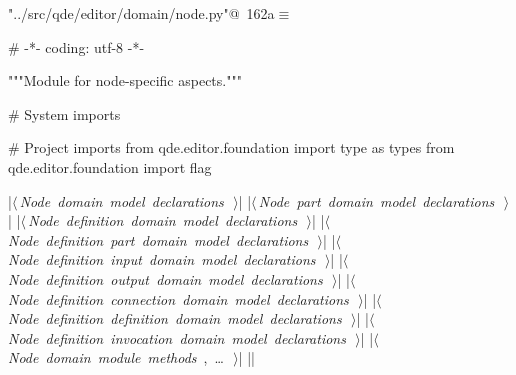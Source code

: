 \documentclass[%
    a4paper,    %
    justified,  %
    nobib,      %
    openany     %
]{tufte-book}
\begin{document}
\begin{flushleft} \small
\begin{minipage}{\linewidth}\label{scrap187}\raggedright\small
{} \verb@"../src/qde/editor/domain/node.py"@\nobreak\ {\footnotesize {162a}}$\equiv$
\vspace{-1ex}
\begin{pythoncode}
# -*- coding: utf-8 -*-

"""Module for node-specific aspects."""

# System imports

# Project imports
from qde.editor.foundation import type as types
from qde.editor.foundation import flag

|\hbox{$\langle\,${\itshape Node domain model declarations}\nobreak\ {\footnotesize {}}$\,\rangle$}|
|\hbox{$\langle\,${\itshape Node part domain model declarations}\nobreak\ {\footnotesize {}}$\,\rangle$}|
|\hbox{$\langle\,${\itshape Node definition domain model declarations}\nobreak\ {\footnotesize {}}$\,\rangle$}|
|\hbox{$\langle\,${\itshape Node definition part domain model declarations}\nobreak\ {\footnotesize {}}$\,\rangle$}|
|\hbox{$\langle\,${\itshape Node definition input domain model declarations}\nobreak\ {\footnotesize {}}$\,\rangle$}|
|\hbox{$\langle\,${\itshape Node definition output domain model declarations}\nobreak\ {\footnotesize {}}$\,\rangle$}|
|\hbox{$\langle\,${\itshape Node definition connection domain model declarations}\nobreak\ {\footnotesize {}}$\,\rangle$}|
|\hbox{$\langle\,${\itshape Node definition definition domain model declarations}\nobreak\ {\footnotesize {}}$\,\rangle$}|
|\hbox{$\langle\,${\itshape Node definition invocation domain model declarations}\nobreak\ {\footnotesize {}}$\,\rangle$}|
|\hbox{$\langle\,${\itshape Node domain module methods}\nobreak\ {\footnotesize {}, \ldots\ }$\,\rangle$}|
|\NWsep|
\end{pythoncode}
\vspace{1.5ex}
\footnotesize
\begin{list}{}{\setlength{\itemsep}{-\parsep}\setlength{\itemindent}{-\leftmargin}}

\item{}
\end{list}
\end{minipage}\vspace{4ex}
\end{flushleft}
\end{document}
